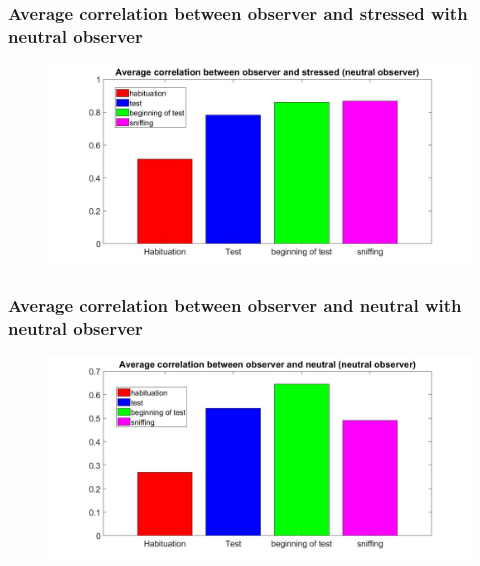 \documentclass{beamer}
\begin{document}
\begin{frame}
\frametitle{ Average correlation between observer and stressed with neutral observer}



\begin{figure}[H]
	\begin{center}
		\hspace*{-1.7cm}
		\includegraphics[scale=.32]{avg_corr_stress.jpg} 
	\end{center}  
	
	
\end{figure}

\end{frame}

\begin{frame}
\frametitle{ Average correlation between observer and neutral with neutral observer}



\begin{figure}[H]
	\begin{center}
		\hspace*{-1.7cm}
		\includegraphics[scale=.32]{avg_corr_neut.jpg} 
	\end{center}  
	
	
\end{figure}

\end{frame}
\end{document}
